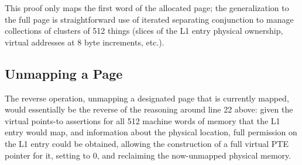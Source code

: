 \documentclass[acmsmall,screen,nonacm]{acmart}
\begin{document}
This proof only maps the first word of the allocated page; the generalization to the full page
is straightforward use of iterated separating conjunction to manage collections of clusters of 512 things
(slices of the L1 entry physical ownership, virtual addresses at 8 byte increments, etc.).

\subsection{Unmapping a Page}
The reverse operation, unmapping a designated page that is currently mapped,
would essentially be the reverse of
the reasoning around line 22 above: given the virtual points-to assertions for all 512
machine words of memory that the L1 entry would map,
and information about the physical location, 
full permission on the L1 entry could be obtained, allowing the construction of a
full virtual PTE pointer for it, setting to 0, and reclaiming the now-unmapped physical memory.
\end{document}
